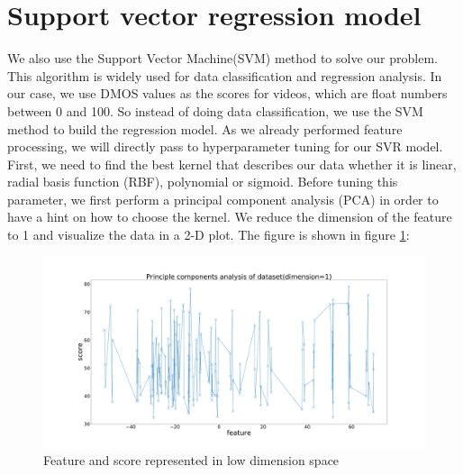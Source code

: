 \documentclass[10pt,conference,compsocconf]{IEEEtran}
\begin{document}
\section{Support vector regression model}
We also use the Support Vector Machine(SVM) method to solve our problem. This algorithm is widely used for data classification and regression analysis. In our case, we use DMOS values as the scores for videos, which are float numbers between 0 and 100. So instead of doing data classification, we use the SVM method to build the regression model. As we already performed feature processing, we will directly pass to hyperparameter tuning for our SVR model. First, we need to find the best kernel that describes our data whether it is linear, radial basis function (RBF), polynomial or sigmoid. Before tuning this parameter, we first perform a principal component analysis (PCA) in order to have a hint on how to choose the kernel. We reduce the dimension of the feature to 1 and visualize the data in a 2-D plot. The figure is shown in figure \ref{pca}:
\begin{figure}[h]
\centering
\includegraphics[trim = {2 0 2 0}, clip, width = \linewidth]{pca.pdf}
\caption{Feature and score represented in low dimension space}
\label{pca}
\end{figure}
\end{document}
